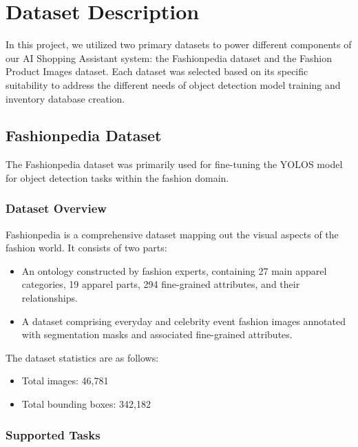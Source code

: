 \chapter{Dataset Description}
\label{chap:dataset_description}


In this project, we utilized two primary datasets to power different components of our AI Shopping Assistant system: the Fashionpedia dataset and the Fashion Product Images dataset. Each dataset was selected based on its specific suitability to address the different needs of object detection model training and inventory database creation.

\section{Fashionpedia Dataset}

The Fashionpedia dataset was primarily used for fine-tuning the YOLOS model for object detection tasks within the fashion domain.

\subsection{Dataset Overview}

Fashionpedia is a comprehensive dataset mapping out the visual aspects of the fashion world. It consists of two parts:

\vspace{-1.25em}
\begin{itemize}
    \setlength\itemsep{-1.5em}
    \item An ontology constructed by fashion experts, containing 27 main apparel categories, 19 apparel parts, 294 fine-grained attributes, and their relationships.
    \item A dataset comprising everyday and celebrity event fashion images annotated with segmentation masks and associated fine-grained attributes.
\end{itemize}

The dataset statistics are as follows:

\vspace{-1.25em}
\begin{itemize}
    \setlength\itemsep{-1.5em}
    \item Total images: 46,781
    \item Total bounding boxes: 342,182
\end{itemize}

\subsection{Supported Tasks}

